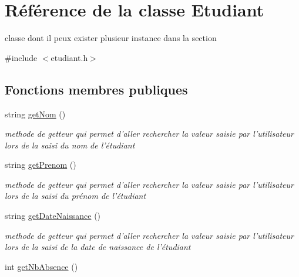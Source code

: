 \hypertarget{class_etudiant}{\section{Référence de la classe Etudiant}
\label{class_etudiant}
}


classe dont il peux exister plusieur instance dans la section  




{\ttfamily \#include $<$etudiant.\+h$>$}

\subsection*{Fonctions membres publiques}
\begin{DoxyCompactItemize}
\item 
\hypertarget{class_etudiant_afdc3229a90d775ed4af4fb40fa647522}{string \hyperlink{class_etudiant_afdc3229a90d775ed4af4fb40fa647522}{get\+Nom} ()}\label{class_etudiant_afdc3229a90d775ed4af4fb40fa647522}

\begin{DoxyCompactList}\small\item\em methode de getteur qui permet d'aller rechercher la valeur saisie par l'utilisateur lors de la saisi du nom de l'étudiant \end{DoxyCompactList}\item 
\hypertarget{class_etudiant_a626fa65bbdbc09a5e7e5864781545aa4}{string \hyperlink{class_etudiant_a626fa65bbdbc09a5e7e5864781545aa4}{get\+Prenom} ()}\label{class_etudiant_a626fa65bbdbc09a5e7e5864781545aa4}

\begin{DoxyCompactList}\small\item\em methode de getteur qui permet d'aller rechercher la valeur saisie par l'utilisateur lors de la saisi du prénom de l'étudiant \end{DoxyCompactList}\item 
\hypertarget{class_etudiant_adac75b58619d7f0991a0cccb6557e194}{string \hyperlink{class_etudiant_adac75b58619d7f0991a0cccb6557e194}{get\+Date\+Naissance} ()}\label{class_etudiant_adac75b58619d7f0991a0cccb6557e194}

\begin{DoxyCompactList}\small\item\em methode de getteur qui permet d'aller rechercher la valeur saisie par l'utilisateur lors de la saisi de la date de naissance de l'étudiant \end{DoxyCompactList}\item 
\hypertarget{class_etudiant_a3f588d55135f5d794ae47f23c1b7a9c7}{int \hyperlink{class_etudiant_a3f588d55135f5d794ae47f23c1b7a9c7}{get\+Nb\+Absence} ()}\label{class_etudiant_a3f588d55135f5d794ae47f23c1b7a9c7}


\end{DoxyCompactItemize}
